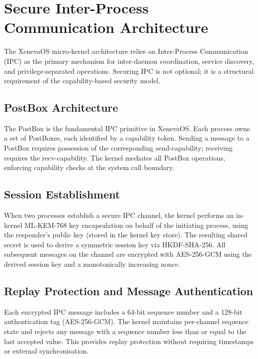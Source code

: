 \documentclass[11pt, a4paper]{article}
\begin{document}
\section{Secure Inter-Process Communication Architecture}\label{sec:secure-ipc-arch}

The XenevaOS micro-kernel architecture relies on Inter-Process Communication (IPC) as the primary mechanism for inter-daemon coordination, service discovery, and privilege-separated operations. Securing IPC is not optional; it is a structural requirement of the capability-based security model.

\subsection{PostBox Architecture}\label{sec:postbox}

The PostBox is the fundamental IPC primitive in XenevaOS. Each process owns a set of PostBoxes, each identified by a capability token. Sending a message to a PostBox requires possession of the corresponding send-capability; receiving requires the recv-capability. The kernel mediates all PostBox operations, enforcing capability checks at the system call boundary.

\subsection{Session Establishment}\label{sec:ipc-session}

When two processes establish a secure IPC channel, the kernel performs an in-kernel ML-KEM-768 key encapsulation on behalf of the initiating process, using the responder's public key (stored in the kernel key store). The resulting shared secret is used to derive a symmetric session key via HKDF-SHA-256. All subsequent messages on the channel are encrypted with AES-256-GCM using the derived session key and a monotonically increasing nonce.

\subsection{Replay Protection and Message Authentication}\label{sec:ipc-replay}

Each encrypted IPC message includes a 64-bit sequence number and a 128-bit authentication tag (AES-256-GCM). The kernel maintains per-channel sequence state and rejects any message with a sequence number less than or equal to the last accepted value. This provides replay protection without requiring timestamps or external synchronisation.
\end{document}
